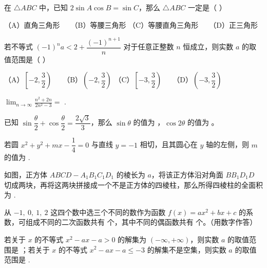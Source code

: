 \begin{question}

在 $\triangle ABC$ 中，已知 $2\sin A\cos B=\sin C$，那么 $\triangle ABC$ 一定是（ ）

（A）直角三角形　　（B）等腰三角形
（C）等腰直角三角形　　（D）正三角形

\end{question}
\begin{question}

若不等式 $(-1)^n a<2+\dfrac{(-1)^{n+1}}{n}$ 对于任意正整数 $n$ 恒成立，则实数 $a$ 的取值范围是（ ）

（A）$\left[-2,\dfrac32\right)$　　（B）$\left(-2,\dfrac32\right)$
（C）$\left[-3,\dfrac32\right)$　　（D）$\left(-3,\dfrac32\right)$

\end{question}

\begin{question}

$\displaystyle\lim_{n\to\infty}\frac{n^2+2n}{2n^2-3}=$ \gkblank{}.

\end{question}
\begin{question}

已知 $\sin\dfrac\theta2+\cos\dfrac\theta2=\dfrac{2\sqrt3}{3}$，那么 $\sin\theta$ 的值为 \gkblank{}，$\cos2\theta$ 的值为 \gkblank{}。

\end{question}
\begin{question}

若圆 $x^2+y^2+mx-\dfrac14=0$ 与直线 $y=-1$ 相切，且其圆心在 $y$ 轴的左侧，则 $m$ 的值为 \gkblank{}.

\Needspace{0.4\textheight}
\end{question}
\begin{question}

如图，正方体 $ABCD-A_1B_1C_1D_1$ 的棱长为 $a$，将该正方体沿对角面 $BB_1D_1D$ 切成两块，再将这两块拼接成一个不是正方体的四棱柱，那么所得四棱柱的全面积为 \gkblank{}.
\nopagebreak[4]
\begin{center}\end{center}
\nopagebreak[4]
\end{question}
\begin{question}

从 $-1,\ 0,\ 1,\ 2$ 这四个数中选三个不同的数作为函数 $f(x)=ax^2+bx+c$ 的系数，可组成不同的二次函数共有 \gkblank{} 个，其中不同的偶函数共有 \gkblank{} 个。（用数字作答）

\end{question}
\begin{question}

若关于 $x$ 的不等式 $x^2-ax-a>0$ 的解集为 $(-\infty,+\infty)$，则实数 $a$ 的取值范围是 \gkblank{}；若关于 $x$ 的不等式 $x^2-ax-a\leqslant-3$ 的解集不是空集，则实数 $a$ 的取值范围是 \gkblank{}.

\end{question}

